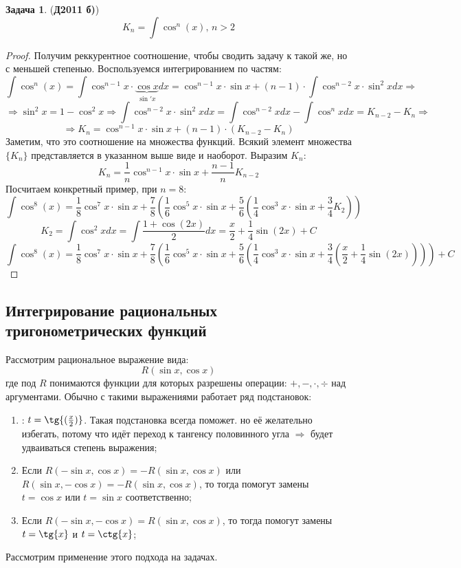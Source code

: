 \documentclass[12pt]{article}
\theoremstyle{definition}
\newtheorem{problem}{Задача}
\DeclareMathOperator{\dint}{\displaystyle\int}
\begin{document}
\begin{problem}(\textbf{Д2011 б)})
	$$
		K_n = \dint \cos^n{(x)}, \, n > 2
	$$
\end{problem}
\begin{proof}
	Получим реккурентное соотношение, чтобы сводить задачу к такой же, но с меньшей степенью. Воспользуемся интегрированием по частям:
	$$
		\dint \cos^n{(x)} = \dint \cos^{n-1}{x}{\cdot}\underbrace{\cos{x}}_{\sin'{x}}dx = \cos^{n-1}{x}{\cdot}\sin{x} + (n-1){\cdot}\dint \cos^{n-2}{x}{\cdot}\sin^2{x}dx \Rightarrow
	$$
	$$
		\Rightarrow \sin^2{x} = 1- \cos^2{x} \Rightarrow \dint \cos^{n-2}{x}{\cdot}\sin^2{x}dx  = \dint \cos^{n-2}{x}dx - \dint \cos^n{x}dx = K_{n-2} - K_n \Rightarrow
	$$
	$$	
		\Rightarrow K_n = \cos^{n-1}{x}{\cdot}\sin{x} + (n-1){\cdot}(K_{n-2} - K_n)
	$$
	Заметим, что это соотношение на множества функций. Всякий элемент множества $\{K_n\}$ представляется в указанном выше виде и наоборот. Выразим $K_n$:
	$$
		K_n = \dfrac{1}{n}\cos^{n-1}{x}{\cdot}\sin{x} + \dfrac{n-1}{n}K_{n-2}
	$$
	Посчитаем конкретный пример, при $n = 8$:
	$$
		\dint \cos^8{(x)} = \dfrac{1}{8}\cos^7{x}{\cdot}\sin{x} + \dfrac{7}{8}\left(\dfrac{1}{6}\cos^5{x}{\cdot}\sin{x} + \dfrac{5}{6}\left(\dfrac{1}{4}\cos^3{x}{\cdot}\sin{x} 
		+\dfrac{3}{4}K_2
		\right)\right)
	$$
	$$
		K_2 = \dint \cos^2{x}dx = \dint \dfrac{1 + \cos{(2x)}}{2}dx = \dfrac{x}{2} + \dfrac{1}{4}\sin{(2x)} + C
	$$
	$$
		\dint \cos^8{(x)} = \dfrac{1}{8}\cos^7{x}{\cdot}\sin{x} + \dfrac{7}{8}\left(\dfrac{1}{6}\cos^5{x}{\cdot}\sin{x} + \dfrac{5}{6}\left(\dfrac{1}{4}\cos^3{x}{\cdot}\sin{x} 
		+\dfrac{3}{4} \left(\dfrac{x}{2} + \dfrac{1}{4}\sin{(2x)}\right)
		\right)\right) + C
	$$
\end{proof}

\subsection*{Интегрирование рациональных тригонометрических функций}
Рассмотрим рациональное выражение вида:
$$
	R(\sin{x},\cos{x})
$$
где под $R$ понимаются функции для которых разрешены операции: $+, -, \cdot, \div$ над аргументами. Обычно с такими выражениями работает ряд подстановок:
\begin{enumerate}[label=(\arabic*)]
	\item {}: $t = \tg{(\frac{x}{2})}$. Такая подстановка всегда поможет. но её желательно избегать, потому что идёт переход к тангенсу половинного угла $\Rightarrow$ будет удваиваться степень выражения;
	\item Если $R(-\sin{x},\cos{x}) = - R(\sin{x},\cos{x})$ или $R(\sin{x},-\cos{x}) = - R(\sin{x},\cos{x})$, то тогда помогут замены $t = \cos{x}$ или $t = \sin{x}$ соответственно;
	\item Если $R(-\sin{x}, -\cos{x}) = R(\sin{x},\cos{x})$, то тогда помогут замены $t = \tg{x}$ и $t = \ctg{x}$;
\end{enumerate}
Рассмотрим применение этого подхода на задачах.
\end{document}
